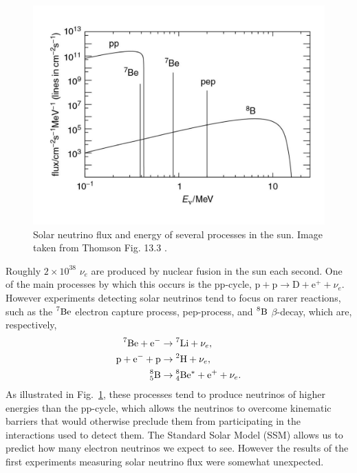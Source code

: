 \begin{figure}
  \centering
  \includegraphics[height=0.33\textheight,keepaspectratio]
                {pictures/t13_3.pdf}
  \caption{Solar neutrino flux and energy of several processes in the sun.
           Image taken from Thomson Fig. 13.3 \cite{thomson_modern_2013}.}
  \label{fig:solar}
\end{figure}
Roughly $2\times10^{38}$ $\nu_e$ are produced by nuclear fusion in the sun
each second. One of the main processes by which this occurs is the pp-cycle,
$\text{p}+\text{p}\to\text{D}+\text{e}^++\nu_e$. However experiments detecting
solar neutrinos tend to focus on rarer reactions, such as the
$\prescript{7}{}{\text{Be}}$ electron capture process, pep-process, and
$\prescript{8}{}{\text{B}}$ $\beta$-decay, which are, respectively,
\begin{equation}
  \begin{aligned}
    \prescript{7}{}{\text{Be}}+\text{e}^-&\to\prescript{7}{}{\text{Li}}+\nu_e,
    \\
    \text{p}+\text{e}^-+\text{p}&\to\prescript{2}{}{\text{H}}+\nu_e, 
    \\
    \prescript{8}{5}{\text{B}}&\to\prescript{8}{4}{\text{Be}}^*+\text{e}^+
      +\nu_e.
  \end{aligned}
\end{equation}
As illustrated in Fig.~\ref{fig:solar}, these processes tend to produce 
neutrinos of higher
energies than the pp-cycle, which allows the neutrinos to overcome kinematic
barriers that would otherwise preclude them from participating in the
interactions used to detect them.
The Standard Solar Model (SSM) allows us to predict how many electron neutrinos
we expect to see. However the results of the first experiments measuring solar
neutrino flux were somewhat unexpected.

